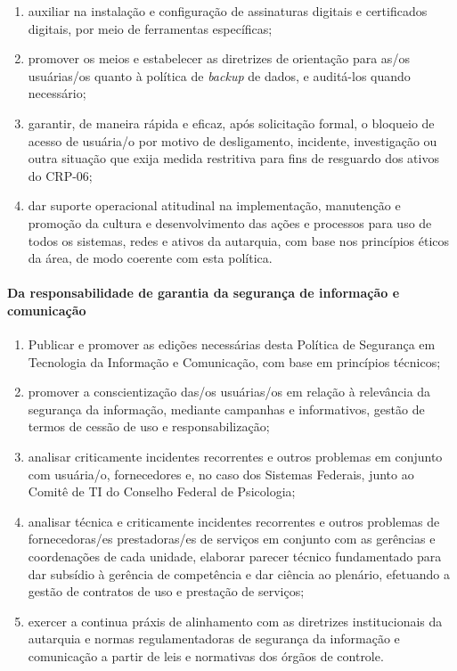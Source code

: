 \begin{enumerate}
    aprovados pelo plenário;
\item
    auxiliar na instalação e configuração de assinaturas digitais e
    certificados digitais, por meio de ferramentas específicas;
\item
    promover os meios e estabelecer as diretrizes de orientação para as/os
    usuárias/os quanto à política de \emph{backup} de dados, e auditá-los
    quando necessário;
\item
    garantir, de maneira rápida e eficaz, após solicitação formal, o
    bloqueio de acesso de usuária/o por motivo de desligamento, incidente,
    investigação ou outra situação que exija medida restritiva para fins
    de resguardo dos ativos do CRP-06;
\item
    dar suporte operacional atitudinal na implementação, manutenção e
    promoção da cultura e desenvolvimento das ações e processos para uso
    de todos os sistemas, redes e ativos da autarquia, com base nos
    princípios éticos da área, de modo coerente com esta política.
\end{enumerate}

\paragraph{Da responsabilidade de garantia da segurança de
informação e
comunicação}

\begin{enumerate}

\item
    Publicar e promover as edições necessárias desta Política de Segurança
    em Tecnologia da Informação e Comunicação, com base em princípios
    técnicos;
\item
    promover a conscientização das/os usuárias/os em relação à relevância
    da segurança da informação, mediante campanhas e informativos, gestão
    de termos de cessão de uso e responsabilização;
\item
    analisar criticamente incidentes recorrentes e outros problemas em
    conjunto com usuária/o, fornecedores e, no caso dos Sistemas Federais,
    junto ao Comitê de TI do Conselho Federal de Psicologia;
\item
    analisar técnica e criticamente incidentes recorrentes e outros
    problemas de fornecedoras/es prestadoras/es de serviços em conjunto
    com as gerências e coordenações de cada unidade, elaborar parecer
    técnico fundamentado para dar subsídio à gerência de competência e dar
    ciência ao plenário, efetuando a gestão de contratos de uso e
    prestação de serviços;
\item
    exercer a continua práxis de alinhamento com as diretrizes
    institucionais da autarquia e normas regulamentadoras de segurança da
    informação e comunicação a partir de leis e normativas dos órgãos de
    controle.
\end{enumerate}